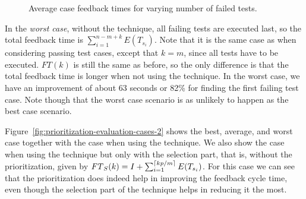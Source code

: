 \documentclass[a4paper,english,12pt]{report}
\DeclarePairedDelimiter{\ceil}{\lceil}{\rceil}
\begin{document}
\begin{figure}[htbp]
  \caption{Average case feedback times for varying number of failed tests.}
  \label{fig:prioritization-evaluation-cases}
\end{figure}

In the \textit{worst case}, without the technique, all failing tests are executed last, so the total feedback time is $\sum_{i=1}^{n-m+k} E(T_{s_i})$. Note that it is the same case as when considering passing test cases, except that $k=m$, since all tests have to be executed. $\mathit{FT}(k)$ is still the same as before, so the only difference is that the total feedback time is longer when not using the technique. In the worst case, we have an improvement of about 63 seconds or 82\% for finding the first failing test case. Note though that the worst case scenario is as unlikely to happen as the best case scenario.

Figure~\vref{fig:prioritization-evaluation-cases-2} shows the best, average, and worst case together with the case when using the technique. We also show the case when using the technique but only with the selection part, that is, without the prioritization, given by $\mathit{FT}_S(k)=I+\sum_{i=1}^{\ceil{kp/m}} E(T_{s_i})$. For this case we can see that the prioritization does indeed help in improving the feedback cycle time, even though the selection part of the technique helps in reducing it the most.
\end{document}
